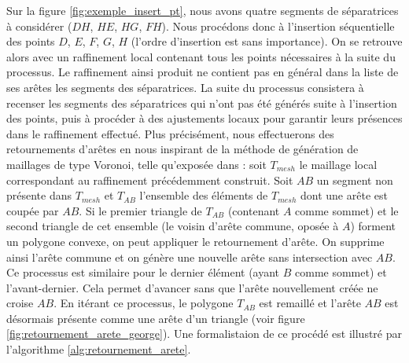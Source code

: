 Sur la figure \ref{fig:exemple_insert_pt}, nous avons quatre segments de séparatrices à considérer ($DH$, $HE$, $HG$, $FH$). Nous procédons donc à l'insertion séquentielle des points $D$, $E$, $F$, $G$, $H$ (l'ordre d'insertion est sans importance). On se retrouve alors avec un raffinement local contenant tous les points nécessaires à la suite du processus. Le raffinement ainsi produit ne contient pas en général dans la liste de ses arêtes les segments des séparatrices. La suite du processus consistera à recenser les segments des séparatrices qui n'ont pas été générés suite à l'insertion des points, puis à procéder à des ajustements locaux pour garantir leurs présences dans le raffinement effectué. Plus précisément, nous effectuerons des retournements d'arêtes en nous inspirant de la méthode de génération de maillages de type Voronoi, telle qu'exposée dans \cite{georgegeneration}: soit $T_{mesh}$ le maillage local correspondant au raffinement précédemment construit. Soit $AB$ un segment non présente dans $T_{mesh}$ et $T_{AB}$ l'ensemble des éléments de $T_{mesh}$ dont une arête est coupée par $AB$. Si le premier triangle de $T_{AB}$ (contenant $A$ comme sommet) et le second triangle de cet ensemble (le voisin d'arête commune, oposée à $A$) forment un polygone convexe, on peut appliquer le retournement d'arête. On supprime ainsi l'arête commune et on génère une nouvelle arête sans intersection avec $AB$. Ce processus est similaire pour le dernier élément (ayant $B$ comme sommet) et l'avant-dernier. Cela permet d'avancer sans que l'arête nouvellement créée ne croise $AB$. En itérant ce processus, le polygone $T_{AB}$ est remaillé et l'arête $AB$ est désormais présente comme une arête d'un triangle (voir figure \ref{fig:retournement_arete_george}). Une formalistaion de ce procédé est illustré par l'algorithme \ref{alg:retournement_arete}.


